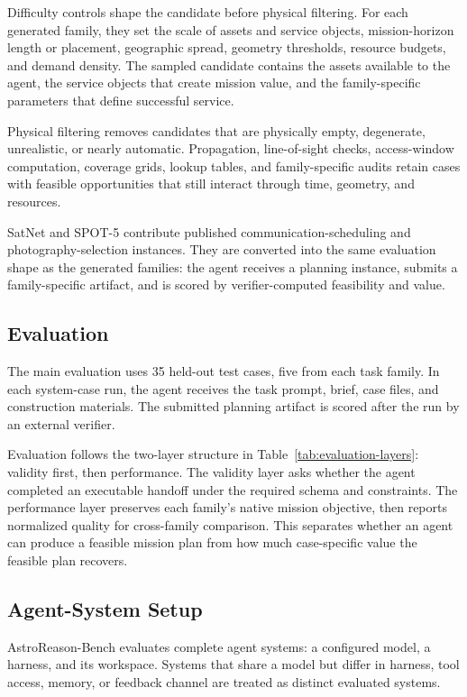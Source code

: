 \documentclass[11pt]{article}
\begin{document}
Difficulty controls shape the candidate before physical filtering. For each generated family, they set the scale of assets and service objects, mission-horizon length or placement, geographic spread, geometry thresholds, resource budgets, and demand density. The sampled candidate contains the assets available to the agent, the service objects that create mission value, and the family-specific parameters that define successful service.

Physical filtering removes candidates that are physically empty, degenerate, unrealistic, or nearly automatic. Propagation, line-of-sight checks, access-window computation, coverage grids, lookup tables, and family-specific audits retain cases with feasible opportunities that still interact through time, geometry, and resources.

SatNet and SPOT-5 contribute published communication-scheduling and photography-selection instances. They are converted into the same evaluation shape as the generated families: the agent receives a planning instance, submits a family-specific artifact, and is scored by verifier-computed feasibility and value.

\subsection{Evaluation}
\label{sec:evaluation}

The main evaluation uses 35 held-out test cases, five from each task family. In each system-case run, the agent receives the task prompt, brief, case files, and construction materials. The submitted planning artifact is scored after the run by an external verifier.

Evaluation follows the two-layer structure in Table~\ref{tab:evaluation-layers}: validity first, then performance. The validity layer asks whether the agent completed an executable handoff under the required schema and constraints. The performance layer preserves each family's native mission objective, then reports normalized quality for cross-family comparison. This separates whether an agent can produce a feasible mission plan from how much case-specific value the feasible plan recovers.

\subsection{Agent-System Setup}
\label{sec:agent-system-setup}

AstroReason-Bench evaluates complete agent systems: a configured model, a harness, and its workspace. Systems that share a model but differ in harness, tool access, memory, or feedback channel are treated as distinct evaluated systems.
\end{document}
